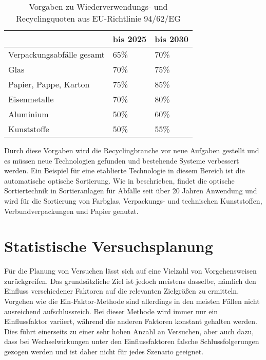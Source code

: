 \begin{table}[]
	\begin{tabular}{|l|l|l|}
		\hline
		& \textbf{bis 2025} & \textbf{bis 2030} \\ \hline
		Verpackungsabfälle gesamt & 65\%              & 70\%              \\ \hline
		Glas                      & 70\%              & 75\%              \\ \hline
		Papier, Pappe, Karton     & 75\%              & 85\%              \\ \hline
		Eisenmetalle              & 70\%              & 80\%              \\ \hline
		Aluminium                 & 50\%              & 60\%              \\ \hline
		Kunststoffe               & 50\%              & 55\%              \\ \hline
	\end{tabular}
	\centering
	\caption{Vorgaben zu Wiederverwendungs- und Recyclingquoten aus EU-Richtlinie 94/62/EG \cite{EuropaischeKommission2018}}
	\label{tab:Quoten2}
\end{table}


Durch diese Vorgaben wird die Recyclingbranche vor neue Aufgaben gestellt und es müssen neue Technologien gefunden und bestehende Systeme verbessert werden. Ein Beispiel für eine etablierte Technologie in diesem Bereich ist die automatische optische Sortierung.
Wie in \citet{Bilitewski} beschrieben, findet die optische Sortiertechnik in Sortieranlagen für Abfälle seit über 20 Jahren Anwendung und wird für die Sortierung von Farbglas, Verpackungs- und technischen Kunststoffen, Verbundverpackungen und Papier genutzt.

\clearpage
\section{Statistische Versuchsplanung}

Für die Planung von Versuchen lässt sich auf eine Vielzahl von Vorgehensweisen zurückgreifen. Das grundsätzliche Ziel ist jedoch meistens dasselbe, nämlich den Einfluss verschiedener Faktoren auf die relevanten Zielgrößen zu ermitteln.
Vorgehen wie die Ein-Faktor-Methode sind allerdings in den meisten Fällen nicht ausreichend aufschlussreich. Bei dieser Methode wird immer nur ein Einflussfaktor variiert, während die anderen Faktoren konstant gehalten werden. Dies führt einerseits zu einer sehr hohen Anzahl an Versuchen, aber auch dazu, dass bei  Wechselwirkungen unter den Einflussfaktoren falsche Schlussfolgerungen gezogen werden und ist daher nicht für jedes Szenario geeignet.

